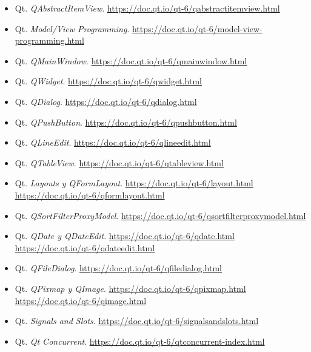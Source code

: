 \documentclass[10pt,a4paper]{article}
\begin{document}
\begin{itemize}
    \item Qt. \textit{QAbstractItemView}.
    \url{https://doc.qt.io/qt-6/qabstractitemview.html}

    \item Qt. \textit{Model/View Programming}.
    \url{https://doc.qt.io/qt-6/model-view-programming.html}

    \item Qt. \textit{QMainWindow}.
    \url{https://doc.qt.io/qt-6/qmainwindow.html}

    \item Qt. \textit{QWidget}.
    \url{https://doc.qt.io/qt-6/qwidget.html}

    \item Qt. \textit{QDialog}.
    \url{https://doc.qt.io/qt-6/qdialog.html}

    \item Qt. \textit{QPushButton}.
    \url{https://doc.qt.io/qt-6/qpushbutton.html}

    \item Qt. \textit{QLineEdit}.
    \url{https://doc.qt.io/qt-6/qlineedit.html}

    \item Qt. \textit{QTableView}.
    \url{https://doc.qt.io/qt-6/qtableview.html}

    \item Qt. \textit{Layouts y QFormLayout}.
    \url{https://doc.qt.io/qt-6/layout.html}
    \url{https://doc.qt.io/qt-6/qformlayout.html}

    \item Qt. \textit{QSortFilterProxyModel}.
    \url{https://doc.qt.io/qt-6/qsortfilterproxymodel.html}

    \item Qt. \textit{QDate y QDateEdit}.
    \url{https://doc.qt.io/qt-6/qdate.html}
    \url{https://doc.qt.io/qt-6/qdateedit.html}

    \item Qt. \textit{QFileDialog}.
    \url{https://doc.qt.io/qt-6/qfiledialog.html}

    \item Qt. \textit{QPixmap y QImage}.
    \url{https://doc.qt.io/qt-6/qpixmap.html}
    \url{https://doc.qt.io/qt-6/qimage.html}

    \item Qt. \textit{Signals and Slots}.
    \url{https://doc.qt.io/qt-6/signalsandslots.html}

    \item Qt. \textit{Qt Concurrent}.
    \url{https://doc.qt.io/qt-6/qtconcurrent-index.html}


\end{itemize}
\end{document}
